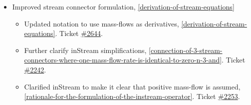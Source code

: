 \begin{itemize}
\item Improved stream connector formulation, \cref{derivation-of-stream-equations}
\begin{itemize}
\item Updated notation to use mass-flows as derivatives, \cref{derivation-of-stream-equations}.
Ticket \href{https://github.com/modelica/ModelicaSpecification/issues/2644}{\#2644}.
\item Further clarify inStream simplifications, \cref{connection-of-3-stream-connectors-where-one-mass-flow-rate-is-identical-to-zero-n-3-and}.
Ticket \href{https://github.com/modelica/ModelicaSpecification/issues/2242}{\#2242}.
\item Clarified inStream to make it clear that positive mass-flow is assumed, \cref{rationale-for-the-formulation-of-the-instream-operator}.
Ticket \href{https://github.com/modelica/ModelicaSpecification/issues/2253}{\#2253}.
\end{itemize}



\end{itemize}
